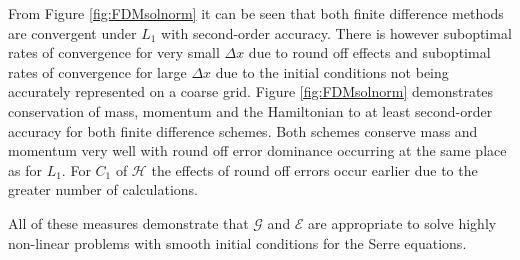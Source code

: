 \documentclass[SingleSpace,12pt,Journal]{Serre_ASCE}
\begin{document}
From Figure \ref{fig:FDMsolnorm} it can be seen that both finite difference methods are convergent under $L_1$ with second-order accuracy. There is however suboptimal rates of convergence for very small $\Delta x$ due to round off effects and suboptimal rates of convergence for large $\Delta x$ due to the initial conditions not being accurately represented on a coarse grid. Figure \ref{fig:FDMsolnorm} demonstrates conservation of mass, momentum and the Hamiltonian to at least second-order accuracy for both finite difference schemes. Both schemes conserve mass and momentum very well with round off error dominance occurring at the same place as for $L_1$. For $C_1$ of $\mathcal{H}$ the effects of round off errors occur earlier due to the greater number of calculations.

All of these measures demonstrate that $\mathcal{G}$ and $\mathcal{E}$ are appropriate to solve highly non-linear problems with smooth initial conditions for the Serre equations. 
\end{document}

